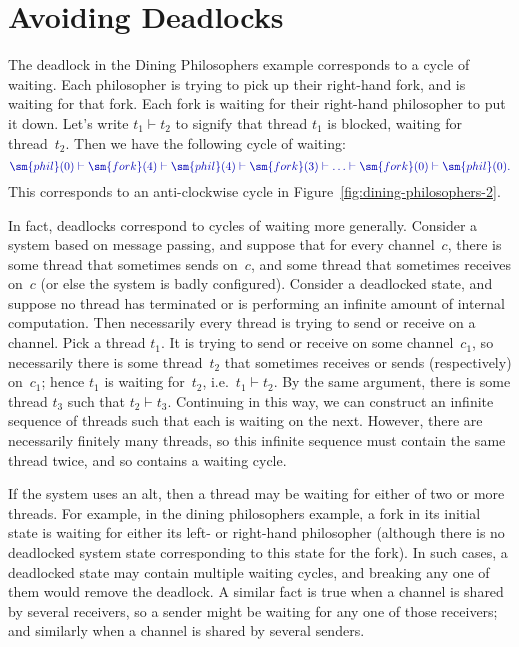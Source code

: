 
\section{Avoiding Deadlocks}
\label{sec:avoid-deadlocks}

\def\waitingFor{\vdash}

The deadlock in the Dining Philosophers example corresponds to a cycle of
waiting.  Each philosopher is trying to pick up their right-hand fork, and is
waiting for that fork.  Each fork is waiting for their right-hand philosopher
to put it down.  Let's write $t_1 \waitingFor t_2$ to signify that thread
$t_1$ is blocked, waiting for thread~$t_2$.  Then we have the following cycle
of waiting:
\[\mstyle
\sm{phil}(0) \waitingFor \sm{fork}(4) \waitingFor \sm{phil}(4) \waitingFor
  \sm{fork}(3) \waitingFor \ldots \waitingFor \sm{fork}(0) \waitingFor
  \sm{phil}(0).
\]
This corresponds to an anti-clockwise cycle in
Figure~\ref{fig:dining-philosophers-2}.

In fact, deadlocks correspond to cycles of waiting more generally.  Consider a
system based on message passing, and suppose that for every channel~$c$, there
is some thread that sometimes sends on~$c$, and some thread that sometimes
receives on~$c$ (or else the system is badly configured).  Consider a
deadlocked state, and suppose no thread has terminated or is performing an
infinite amount of internal computation.  Then necessarily every thread is
trying to send or receive on a channel.  Pick a thread $t_1$.  It is trying to
send or receive on some channel~$c_1$, so necessarily there is some
thread~$t_2$ that sometimes receives or sends (respectively) on~$c_1$; hence
$t_1$ is waiting for~$t_2$, i.e.~$t_1 \waitingFor t_2$.  By the same argument,
there is some thread $t_3$ such that $t_2 \waitingFor t_3$.  Continuing in
this way, we can construct an infinite sequence of threads such that each is
waiting on the next.  However, there are necessarily finitely many threads, so
this infinite sequence must contain the same thread twice, and so contains a
waiting cycle.

If the system uses an alt, then a thread may be waiting for either of two or
more threads.  For example, in the dining philosophers example, a fork in its
initial state is waiting for either its left- or right-hand philosopher
(although there is no deadlocked system state corresponding to this state for
the fork).  In such cases, a deadlocked state may contain multiple waiting
cycles, and breaking any one of them would remove the deadlock.  A similar
fact is true when a channel is shared by several receivers, so a sender might
be waiting for any one of those receivers; and similarly when a channel is
shared by several senders.


